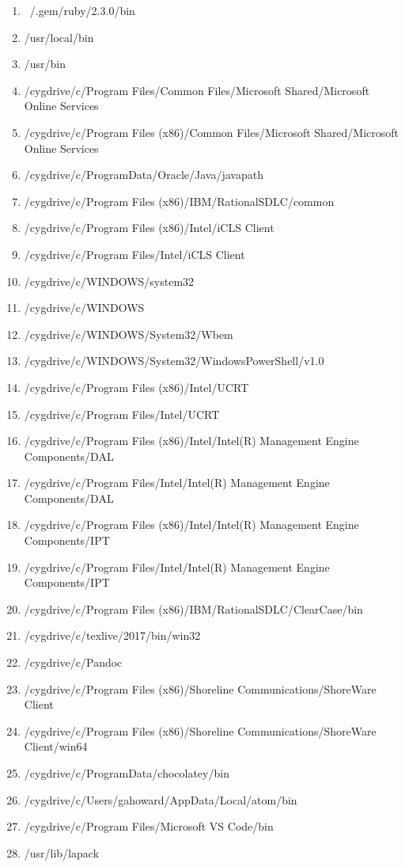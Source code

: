 \begin{description}[align=right,leftmargin=*,labelindent=5cm]
\begin{enumerate}
\item ~/.gem/ruby/2.3.0/bin
\item /usr/local/bin
\item /usr/bin
\item /cygdrive/c/Program Files/Common Files/Microsoft Shared/Microsoft Online Services
\item /cygdrive/c/Program Files (x86)/Common Files/Microsoft Shared/Microsoft Online Services
\item /cygdrive/c/ProgramData/Oracle/Java/javapath
\item /cygdrive/c/Program Files (x86)/IBM/RationalSDLC/common
\item /cygdrive/c/Program Files (x86)/Intel/iCLS Client
\item /cygdrive/c/Program Files/Intel/iCLS Client
\item /cygdrive/c/WINDOWS/system32
\item /cygdrive/c/WINDOWS
\item /cygdrive/c/WINDOWS/System32/Wbem
\item /cygdrive/c/WINDOWS/System32/WindowsPowerShell/v1.0
\item /cygdrive/c/Program Files (x86)/Intel/UCRT
\item /cygdrive/c/Program Files/Intel/UCRT
\item /cygdrive/c/Program Files (x86)/Intel/Intel(R) Management Engine Components/DAL
\item /cygdrive/c/Program Files/Intel/Intel(R) Management Engine Components/DAL
\item /cygdrive/c/Program Files (x86)/Intel/Intel(R) Management Engine Components/IPT
\item /cygdrive/c/Program Files/Intel/Intel(R) Management Engine Components/IPT
\item /cygdrive/c/Program Files (x86)/IBM/RationalSDLC/ClearCase/bin
\item /cygdrive/c/texlive/2017/bin/win32
\item /cygdrive/c/Pandoc
\item /cygdrive/c/Program Files (x86)/Shoreline Communications/ShoreWare Client
\item /cygdrive/c/Program Files (x86)/Shoreline Communications/ShoreWare Client/win64
\item /cygdrive/c/ProgramData/chocolatey/bin
\item /cygdrive/c/Users/gahoward/AppData/Local/atom/bin
\item /cygdrive/c/Program Files/Microsoft VS Code/bin
\item /usr/lib/lapack

\end{enumerate}
\end{description}
